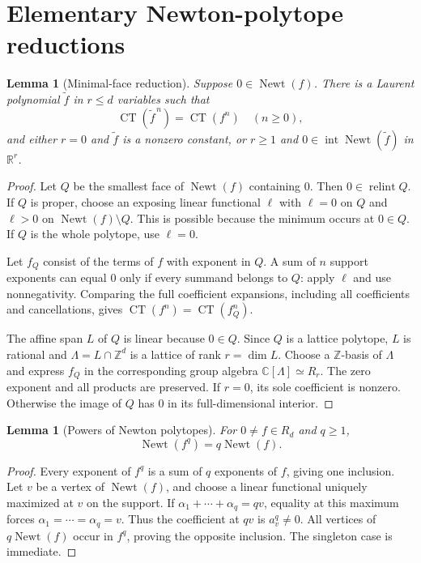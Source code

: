 \documentclass[11pt]{article}
\numberwithin{equation}{section}
\newtheorem{lemma}[theorem]{Lemma}
\theoremstyle{definition}
\theoremstyle{remark}
\newcommand{\C}{\mathbb C}
\newcommand{\R}{\mathbb R}
\newcommand{\Z}{\mathbb Z}
\newcommand{\CT}{\operatorname{CT}}
\newcommand{\Newt}{\operatorname{Newt}}
\newcommand{\Int}{\operatorname{int}}
\newcommand{\relint}{\operatorname{relint}}
\begin{document}
\section{Elementary Newton-polytope reductions}\label{sec:newton}
\begin{lemma}[Minimal-face reduction]\label{lem:face}
Suppose $0\in\Newt(f)$. There is a Laurent polynomial $\widetilde f$ in
$r\le d$ variables such that
\[
 \CT(\widetilde f^{\,n})=\CT(f^n)\quad(n\ge0),
\]
and either $r=0$ and $\widetilde f$ is a nonzero constant, or $r\ge1$ and
$0\in\Int\Newt(\widetilde f)$ in $\R^r$.
\end{lemma}
\begin{proof}
Let $Q$ be the smallest face of $\Newt(f)$ containing $0$. Then
$0\in\relint Q$. If $Q$ is proper, choose an exposing linear functional
$\ell$ with $\ell=0$ on $Q$ and $\ell>0$ on $\Newt(f)\setminus Q$.
This is possible because the minimum occurs at $0\in Q$. If $Q$ is the
whole polytope, use $\ell=0$.

Let $f_Q$ consist of the terms of $f$ with exponent in $Q$. A sum of
$n$ support exponents can equal $0$ only if every summand belongs to $Q$:
apply $\ell$ and use nonnegativity. Comparing the full coefficient
expansions, including all coefficients and cancellations, gives
$\CT(f^n)=\CT(f_Q^n)$.

The affine span $L$ of $Q$ is linear because $0\in Q$. Since $Q$ is a
lattice polytope, $L$ is rational and $\Lambda=L\cap\Z^d$ is a lattice
of rank $r=\dim L$. Choose a $\Z$-basis of $\Lambda$ and express $f_Q$
in the corresponding group algebra $\C[\Lambda]\simeq R_r$. The zero
exponent and all products are preserved. If $r=0$, its sole coefficient
is nonzero. Otherwise the image of $Q$ has $0$ in its full-dimensional
interior.
\end{proof}

\begin{lemma}[Powers of Newton polytopes]\label{lem:powers}
For $0\ne f\in R_d$ and $q\ge1$,
\[
 \Newt(f^q)=q\Newt(f).
\]
\end{lemma}
\begin{proof}
Every exponent of $f^q$ is a sum of $q$ exponents of $f$, giving one
inclusion. Let $v$ be a vertex of $\Newt(f)$, and choose a linear
functional uniquely maximized at $v$ on the support. If
$\alpha_1+\cdots+\alpha_q=qv$, equality at this maximum forces
$\alpha_1=\cdots=\alpha_q=v$. Thus the coefficient at $qv$ is
$a_v^q\ne0$. All vertices of $q\Newt(f)$ occur in $f^q$, proving the
opposite inclusion. The singleton case is immediate.
\end{proof}
\end{document}

